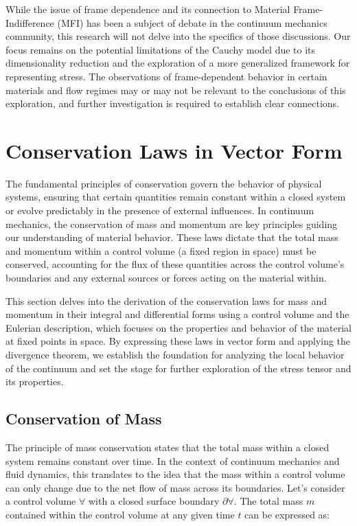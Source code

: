 \documentclass[12pt,a4paper,english]{article}
\begin{document}
While the issue of frame dependence and its connection to Material Frame-Indifference (MFI) has been a subject of debate in the continuum mechanics community, this research will not delve into the specifics of those discussions. Our focus remains on the potential limitations of the Cauchy model due to its dimensionality reduction and the exploration of a more generalized framework for representing stress. The observations of frame-dependent behavior in certain materials and flow regimes may or may not be relevant to the conclusions of this exploration, and further investigation is required to establish clear connections.

\section{Conservation Laws in Vector Form}

The fundamental principles of conservation govern the behavior of physical systems, ensuring that certain quantities remain constant within a closed system or evolve predictably in the presence of external influences. In continuum mechanics, the conservation of mass and momentum are key principles guiding our understanding of material behavior. These laws dictate that the total mass and momentum within a control volume (a fixed region in space) must be conserved, accounting for the flux of these quantities across the control volume's boundaries and any external sources or forces acting on the material within.

This section delves into the derivation of the conservation laws for mass and momentum in their integral and differential forms using a control volume and the Eulerian description, which focuses on the properties and behavior of the material at fixed points in space. By expressing these laws in vector form and applying the divergence theorem, we establish the foundation for analyzing the local behavior of the continuum and set the stage for further exploration of the stress tensor and its properties.

\subsection{Conservation of Mass}

The principle of mass conservation states that the total mass within a closed system remains constant over time. In the context of continuum mechanics and fluid dynamics, this translates to the idea that the mass within a control volume can only change due to the net flow of mass across its boundaries. Let's consider a control volume $\forall$ with a closed surface boundary $\partial \forall$. The total mass $m$ contained within the control volume at any given time $t$ can be expressed as:
\end{document}
